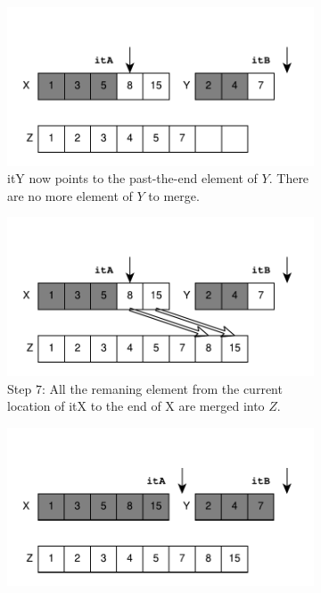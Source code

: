 \begin{figure}
	\begin{subfigure}[b]{0.45\textwidth}
		\centering
		\includegraphics[trim=0 0 0 45,clip,width=\textwidth]{sources/median_sorted_arrays/images/mergearrays6}
		\caption{ itY now  points to the past-the-end element of $Y$. There are no more element of $Y$ to merge.}
		\label{fig:median_sorted_array:mergearray6}
	\end{subfigure}
	\hfill
	\begin{subfigure}[b]{0.45\textwidth}
		\centering
		\includegraphics[trim=0 0 0 45,clip,width=\textwidth]{sources/median_sorted_arrays/images/mergearrays7}
		\caption{Step $7$: All the remaning element from the current location of itX to the end of X are merged into $Z$. }
		\label{fig:median_sorted_array:mergearray7}
	\end{subfigure}
	\hfill
	\begin{subfigure}[b]{0.45\textwidth}
		\centering
		\includegraphics[trim=0 0 0 45,clip,width=\textwidth]{sources/median_sorted_arrays/images/mergearrays8}

\end{subfigure}
\end{figure}
